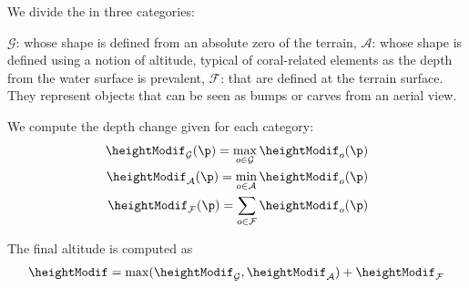 We divide the  in three categories: 
\begin{Itemize}
    \Item{} $\mathcal{G}$:  whose shape is defined from an absolute zero of the terrain,
    \Item{} $\mathcal{A}$:  whose shape is defined using a notion of altitude, typical of coral-related elements as the depth from the water surface is prevalent,
    \Item{} $\mathcal{F}$:  that are defined at the terrain surface. They represent objects that can be seen as bumps or carves from an aerial view. 
\end{Itemize}


We compute the depth change given for each category:
\begin{align*}
    \heightModif_{\mathcal{G}} (\p) = \max_{o \in \mathcal{G}}{ \heightModif_o(\p) } \\
    \heightModif_{\mathcal{A}} (\p) = \min_{o \in \mathcal{A}}{ \heightModif_o(\p) } \\
    \heightModif_{\mathcal{F}} (\p) = \sum_{o \in \mathcal{F}}{ \heightModif_o(\p) }
\end{align*}

The final altitude is computed as
\begin{align}
    \heightModif = \max(\heightModif_{\mathcal{G}}, \heightModif_{\mathcal{A}}) + \heightModif_{\mathcal{F}}
\end{align}

